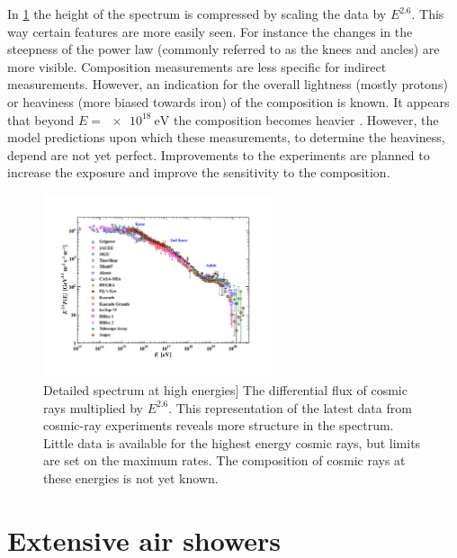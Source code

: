 In \cref{fig:PDG_28_8_all_particle_spectrum} the height of the spectrum is compressed by scaling the data by $E^{2.6}$. This way certain features are more easily seen. For instance the changes in the steepness of the power law (commonly referred to as the knees and ancles) are more visible. Composition measurements are less specific for indirect measurements. However, an indication for the overall lightness (mostly protons) or heaviness (more biased towards iron) of the composition is known. It appears that beyond $E = \SI{e18}{\eV}$ the composition becomes heavier \cite{abbasi2015combined}. However, the model predictions upon which these measurements, to determine the heaviness, depend are not yet perfect. Improvements to the experiments are planned to increase the exposure and improve the sensitivity to the composition.

\begin{figure}
    \centering
    \includegraphics[width=0.6\textwidth]
                    {plots/cosmic-rays/PDG_28_8_all_particle_spectrum}
    \caption{Detailed spectrum at high energies]
The differential flux of cosmic rays multiplied by $E^{2.6}$. This representation of the latest data from cosmic-ray experiments reveals more structure in the spectrum. Little data is available for the highest energy cosmic rays, but limits are set on the maximum rates. The composition of cosmic rays at these energies is not yet known.}
    \label{fig:PDG_28_8_all_particle_spectrum}
\end{figure}


\section{Extensive air showers}
\label{sec:cr:eas}

